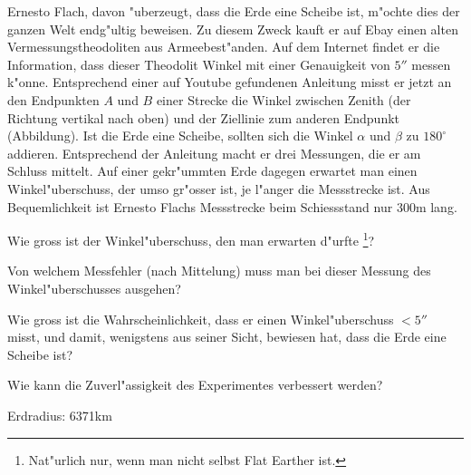 Ernesto Flach, davon "uberzeugt, dass die Erde eine Scheibe ist,
m"ochte dies der ganzen Welt endg"ultig beweisen.
Zu diesem Zweck kauft er auf Ebay einen alten Vermessungstheodoliten
aus Armeebest"anden.
Auf dem Internet findet er die Information, dass dieser Theodolit Winkel
mit einer Genauigkeit von $5''$ messen k"onne.
Entsprechend einer auf Youtube gefundenen Anleitung misst er jetzt an
den Endpunkten $A$ und $B$ einer Strecke die Winkel zwischen Zenith
(der Richtung vertikal nach oben) und der Ziellinie zum anderen Endpunkt
(Abbildung).
Ist die Erde eine Scheibe, sollten sich die Winkel $\alpha$
und $\beta$ zu $180^\circ$
addieren.
Entsprechend der Anleitung macht er drei Messungen, die er am Schluss 
mittelt.
Auf einer gekr"ummten Erde dagegen erwartet man einen Winkel"uberschuss,
der umso gr"osser ist, je l"anger die Messstrecke ist.
Aus Bequemlichkeit ist Ernesto Flachs Messstrecke beim Schiessstand
nur 300m lang.
\begin{center}
\end{center}

\begin{teilaufgaben}
\item
Wie gross ist der Winkel"uberschuss, den man erwarten d"urfte%
\footnote{Nat"urlich nur, wenn man nicht selbst Flat Earther ist.}?
\item
Von welchem Messfehler (nach Mittelung) muss man bei dieser Messung
des Winkel"uberschusses ausgehen?
\item
Wie gross ist die Wahrscheinlichkeit, dass er einen Winkel"uberschuss $<5''$
misst, und damit, wenigstens aus seiner Sicht, bewiesen hat, dass
die Erde eine Scheibe ist?
\item 
Wie kann die Zuverl"assigkeit des Experimentes verbessert werden?
\end{teilaufgaben}

\begin{hinweis}
Erdradius: 6371km
\end{hinweis}

